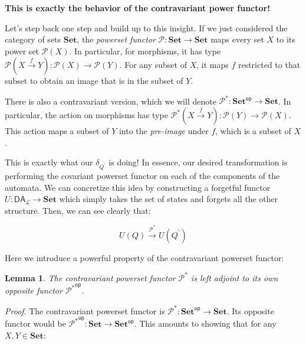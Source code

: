 \documentclass{article}
\theoremstyle{plain}
\newtheorem{lemma}{Lemma}
\theoremstyle{definition}
\begin{document}
\textbf{This is exactly the behavior of the contravariant power functor!}

Let's step back one step and build up to this insight. If we just considered the category of sets \ensuremath{\mathbf{Set}}, the \emph{powerset functor} \ensuremath{\mathcal{P} : \mathbf{Set} \rightarrow \mathbf{Set}} maps every set \ensuremath{X} to its power set \ensuremath{\mathcal{P}\left( X \right)}. In particular, for morphisms, it has type \ensuremath{\mathcal{P}\left( X \xrightarrow{f} Y \right) : \mathcal{P}\left( X \right) \rightarrow \mathcal{P}\left( Y \right)}. For any subset of \ensuremath{X}, it maps \ensuremath{f} restricted to that subset to obtain an image that is in the subset of \ensuremath{Y}.

There is also a contravariant version, which we will denote \ensuremath{{\mathcal{P}}^{\ast } : {\mathbf{Set}}^{\mathsf{op}} \rightarrow \mathbf{Set}}. In particular, the action on morphisms has type \ensuremath{{\mathcal{P}}^{\ast } \left( X \xrightarrow{f} Y \right) : \mathcal{P}\left( Y \right) \rightarrow \mathcal{P}\left( X \right)}. This action maps a subset of \ensuremath{Y} into the \emph{pre-image} under \ensuremath{f}, which is a subset of \ensuremath{X}.

This is exactly what our \ensuremath{{\delta }_{{Q}^{'}}} is doing! In essence, our desired transformation is performing the covariant powerset functor on each of the components of the automata. We can concretize this idea by constructing a forgetful functor \ensuremath{U : {\mathsf{DA}}_{\mathcal{L}} \rightarrow \mathbf{Set}} which simply takes the set of states and forgets all the other structure. Then, we can see clearly that:

\[
U\left( Q \right) \xrightarrow{{\mathcal{P}}^{\ast }} U\left( {Q}^{'} \right)
\]

Here we introduce a powerful property of the contravariant powerset functor:

\begin{lemma}
The contravariant powerset functor \ensuremath{{\mathcal{P}}^{\ast }} is left adjoint to its own opposite functor \ensuremath{{{\mathcal{P}}^{\ast }}^{\mathsf{op}}}.
\end{lemma}
\label{contrPowerSetSelfDual} 

\emph{Proof}.  The contravariant powerset functor is \ensuremath{{\mathcal{P}}^{\ast } : {\mathbf{Set}}^{\mathsf{op}} \rightarrow \mathbf{Set}}. Its opposite functor would be \ensuremath{{{\mathcal{P}}^{\ast }}^{\mathsf{op}} : \mathbf{Set} \rightarrow {\mathbf{Set}}^{\mathsf{op}}}. This amounts to showing that for any \ensuremath{X, Y \in \mathbf{Set}}:
\end{document}
